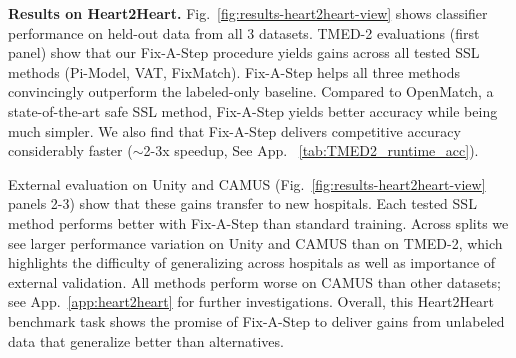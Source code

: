 \label{sec:results-tmed}
\textbf{Results on Heart2Heart.}
Fig.~\ref{fig:results-heart2heart-view} shows classifier performance on held-out data from all 3 datasets.
TMED-2 evaluations (first panel) show that our Fix-A-Step procedure yields gains across all tested SSL methods (Pi-Model, VAT, FixMatch). Fix-A-Step helps all three methods convincingly outperform the labeled-only baseline.
Compared to OpenMatch, a state-of-the-art safe SSL method, Fix-A-Step yields better accuracy while being much simpler. 
We also find that Fix-A-Step delivers competitive accuracy considerably faster ($\sim$2-3x speedup, See App. ~\ref{tab:TMED2_runtime_acc}).


External evaluation on Unity and CAMUS (Fig.~\ref{fig:results-heart2heart-view} panels 2-3) show that these gains transfer to new hospitals.
Each tested SSL method performs better with Fix-A-Step than standard training.
Across splits we see larger performance variation on Unity and CAMUS than on TMED-2, which highlights the difficulty of generalizing across hospitals as well as importance of external validation. 
All methods perform worse on CAMUS than other datasets; see App.~\ref{app:heart2heart} for further investigations.
Overall, this Heart2Heart benchmark task shows the promise of Fix-A-Step to deliver gains from unlabeled data that generalize better than alternatives.





